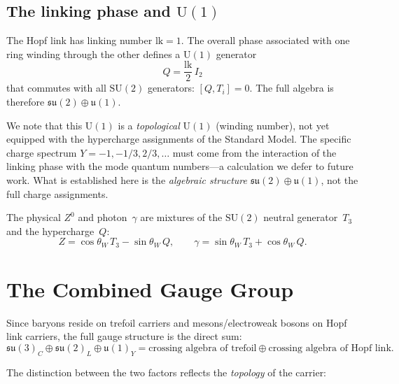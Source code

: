 \documentclass[11pt,a4paper]{article}
\begin{document}
\subsection{The linking phase and $\mathrm{U}(1)$}

The Hopf link has linking number $\mathrm{lk} = 1$.  The
overall phase associated with one ring winding through the other
defines a $\mathrm{U}(1)$ generator
\begin{equation}
  Q = \frac{\mathrm{lk}}{2}\,I_2
  \label{eq:hypercharge}
\end{equation}
that commutes with all $\mathrm{SU}(2)$ generators:
$[Q, T_i] = 0$.  The full algebra is therefore
$\mathfrak{su}(2) \oplus \mathfrak{u}(1)$.

We note that this $\mathrm{U}(1)$ is a \emph{topological}
$\mathrm{U}(1)$ (winding number), not yet equipped with the
hypercharge assignments of the Standard Model.  The specific
charge spectrum $Y = -1, -1/3, 2/3, \ldots$ must come from
the interaction of the linking phase with the mode quantum
numbers---a calculation we defer to future work.  What is
established here is the \emph{algebraic structure}
$\mathfrak{su}(2) \oplus \mathfrak{u}(1)$, not the full
charge assignments.

The physical $Z^0$ and photon~$\gamma$ are mixtures of the
$\mathrm{SU}(2)$ neutral generator~$T_3$ and the hypercharge~$Q$:
\begin{equation}
  Z = \cos\theta_W\, T_3 - \sin\theta_W\, Q, \qquad
  \gamma = \sin\theta_W\, T_3 + \cos\theta_W\, Q.
  \label{eq:mixing}
\end{equation}


\section{The Combined Gauge Group}
\label{sec:combined}

Since baryons reside on trefoil carriers and mesons/electroweak
bosons on Hopf link carriers, the full gauge structure is the
direct sum:
\begin{equation}
  \boxed{
  \mathfrak{su}(3)_C \oplus \mathfrak{su}(2)_L \oplus
  \mathfrak{u}(1)_Y
  = \text{crossing algebra of trefoil} \oplus
    \text{crossing algebra of Hopf link}.
  }
  \label{eq:fullgauge}
\end{equation}

The distinction between the two factors reflects the
\emph{topology} of the carrier:
\end{document}
